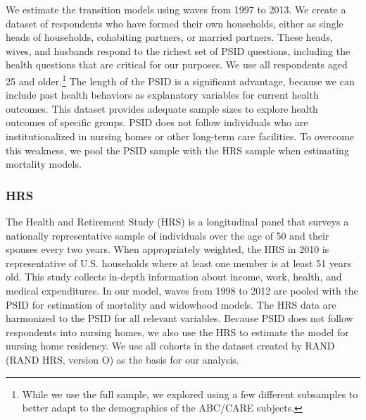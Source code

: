 \noindent We estimate the transition models using waves from 1997 to 2013. We create a dataset of respondents who have formed their own households, either
as single heads of households, cohabiting partners, or married partners.  These heads, wives, and husbands respond to the richest
set of PSID questions, including the health questions that are critical for our purposes. We use all respondents aged 25 and older.\footnote{While we use the full sample, we explored using a few different subsamples to better adapt to the demographics of the ABC/CARE subjects.}  
The length of the PSID is a significant advantage, because we can include past health behaviors as explanatory variables for current health outcomes. This dataset provides adequate sample sizes to explore health outcomes of specific groups. 
PSID does not follow individuals who are institutionalized in nursing homes or other long-term care facilities. To overcome this weakness, we pool the PSID sample with the HRS sample when
estimating mortality models. \\

\subsubsection{HRS}

\noindent The Health and Retirement Study (HRS) is a longitudinal panel that surveys a nationally representative sample of individuals over the age of 50 and their spouses every two years.  When appropriately weighted, the HRS in 2010 is representative of U.S. households 
where at least one member is at least 51 years old.
This study collects in-depth information about income, work, health, and medical expenditures. In our model, waves from 1998 to 2012 are pooled with the PSID for estimation of mortality and 
widowhood models. The HRS data
are harmonized to the PSID for all relevant variables. Because PSID does not follow respondents into nursing homes, we also use the HRS to estimate the model for nursing home residency.  We use all cohorts in the dataset created by RAND (RAND HRS, version O) as the basis 
for our analysis. \\

